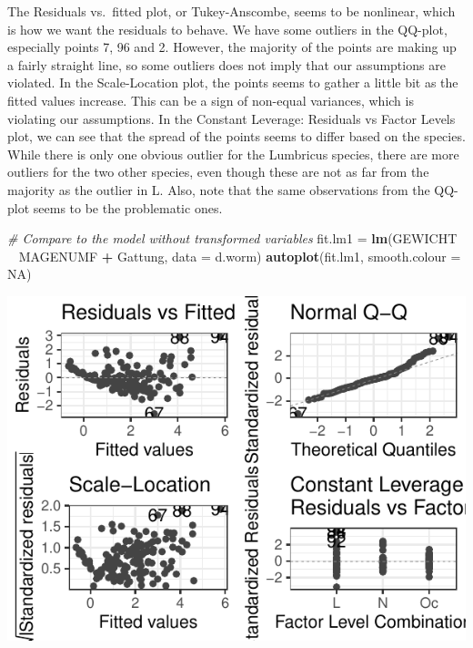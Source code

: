 \documentclass[
]{article}
\newenvironment{Shaded}{\begin{snugshade}}{\end{snugshade}}
\newcommand{\CommentTok}[1]{\textcolor[rgb]{0.56,0.35,0.01}{\textit{#1}}}
\newcommand{\DataTypeTok}[1]{\textcolor[rgb]{0.13,0.29,0.53}{#1}}
\newcommand{\KeywordTok}[1]{\textcolor[rgb]{0.13,0.29,0.53}{\textbf{#1}}}
\newcommand{\NormalTok}[1]{#1}
\newcommand{\OperatorTok}[1]{\textcolor[rgb]{0.81,0.36,0.00}{\textbf{#1}}}
\newcommand{\OtherTok}[1]{\textcolor[rgb]{0.56,0.35,0.01}{#1}}
\newcommand{\StringTok}[1]{\textcolor[rgb]{0.31,0.60,0.02}{#1}}
\begin{document}
The Residuals vs.~fitted plot, or Tukey-Anscombe, seems to be nonlinear,
which is how we want the residuals to behave. We have some outliers in
the QQ-plot, especially points 7, 96 and 2. However, the majority of the
points are making up a fairly straight line, so some outliers does not
imply that our assumptions are violated. In the Scale-Location plot, the
points seems to gather a little bit as the fitted values increase. This
can be a sign of non-equal variances, which is violating our
assumptions. In the Constant Leverage: Residuals vs Factor Levels plot,
we can see that the spread of the points seems to differ based on the
species. While there is only one obvious outlier for the Lumbricus
species, there are more outliers for the two other species, even though
these are not as far from the majority as the outlier in L. Also, note
that the same observations from the QQ-plot seems to be the problematic
ones.

\begin{Shaded}
\begin{Highlighting}[]
\CommentTok{# Compare to the model without transformed variables}
\NormalTok{fit.lm1 =}\StringTok{ }\KeywordTok{lm}\NormalTok{(GEWICHT }\OperatorTok{~}\StringTok{ }\NormalTok{MAGENUMF }\OperatorTok{+}\StringTok{ }\NormalTok{Gattung, }\DataTypeTok{data =}\NormalTok{ d.worm)}
\KeywordTok{autoplot}\NormalTok{(fit.lm1, }\DataTypeTok{smooth.colour =} \OtherTok{NA}\NormalTok{)}
\end{Highlighting}
\end{Shaded}

\includegraphics{Project_1_files/figure-latex/unnamed-chunk-8-1.pdf}
\end{document}
